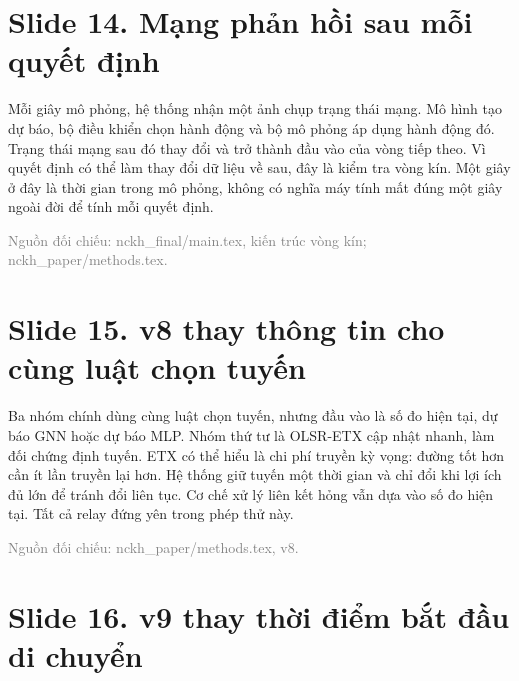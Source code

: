 
\section*{Slide 14. Mạng phản hồi sau mỗi quyết định}


Mỗi giây mô phỏng, hệ thống nhận một ảnh chụp trạng thái mạng. Mô hình tạo dự báo, bộ điều khiển chọn hành động và bộ mô phỏng áp dụng hành động đó. Trạng thái mạng sau đó thay đổi và trở thành đầu vào của vòng tiếp theo. Vì quyết định có thể làm thay đổi dữ liệu về sau, đây là kiểm tra vòng kín. Một giây ở đây là thời gian trong mô phỏng, không có nghĩa máy tính mất đúng một giây ngoài đời để tính mỗi quyết định.

{\small\textcolor{gray}{Nguồn đối chiếu: nckh\_final/main.tex, kiến trúc vòng kín; nckh\_paper/methods.tex.}}




\section*{Slide 15. v8 thay thông tin cho cùng luật chọn tuyến}


Ba nhóm chính dùng cùng luật chọn tuyến, nhưng đầu vào là số đo hiện tại, dự báo GNN hoặc dự báo MLP. Nhóm thứ tư là OLSR-ETX cập nhật nhanh, làm đối chứng định tuyến. ETX có thể hiểu là chi phí truyền kỳ vọng: đường tốt hơn cần ít lần truyền lại hơn. Hệ thống giữ tuyến một thời gian và chỉ đổi khi lợi ích đủ lớn để tránh đổi liên tục. Cơ chế xử lý liên kết hỏng vẫn dựa vào số đo hiện tại. Tất cả relay đứng yên trong phép thử này.

{\small\textcolor{gray}{Nguồn đối chiếu: nckh\_paper/methods.tex, v8.}}




\section*{Slide 16. v9 thay thời điểm bắt đầu di chuyển}


